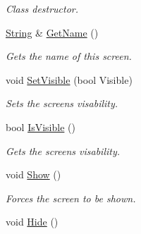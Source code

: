 \begin{DoxyCompactItemize}
\begin{DoxyCompactList}\small\item\em Class destructor. \item\end{DoxyCompactList}\item 
\hyperlink{namespacephys_aa03900411993de7fbfec4789bc1d392e}{String} \& \hyperlink{classphys_1_1UIScreen_aee363edcdc7d21197e4103668011f8fb}{GetName} ()
\begin{DoxyCompactList}\small\item\em Gets the name of this screen. \item\end{DoxyCompactList}\item 
void \hyperlink{classphys_1_1UIScreen_ac8b143b35fd96e9aed694089d2732396}{SetVisible} (bool Visible)
\begin{DoxyCompactList}\small\item\em Sets the screens visability. \item\end{DoxyCompactList}\item 
bool \hyperlink{classphys_1_1UIScreen_a8f64052f7bb0b6be2f55c73f31bfea29}{IsVisible} ()
\begin{DoxyCompactList}\small\item\em Gets the screens visability. \item\end{DoxyCompactList}\item 
\hypertarget{classphys_1_1UIScreen_a0ba9ce016f7da06ab73fa2abea134a18}{
void \hyperlink{classphys_1_1UIScreen_a0ba9ce016f7da06ab73fa2abea134a18}{Show} ()}
\label{d9/de8/classphys_1_1UIScreen_a0ba9ce016f7da06ab73fa2abea134a18}

\begin{DoxyCompactList}\small\item\em Forces the screen to be shown. \item\end{DoxyCompactList}\item 
\hypertarget{classphys_1_1UIScreen_af9ea18cf145e31b90dbe02faed758343}{
void \hyperlink{classphys_1_1UIScreen_af9ea18cf145e31b90dbe02faed758343}{Hide} ()}
\label{d9/de8/classphys_1_1UIScreen_af9ea18cf145e31b90dbe02faed758343}


\end{DoxyCompactItemize}
